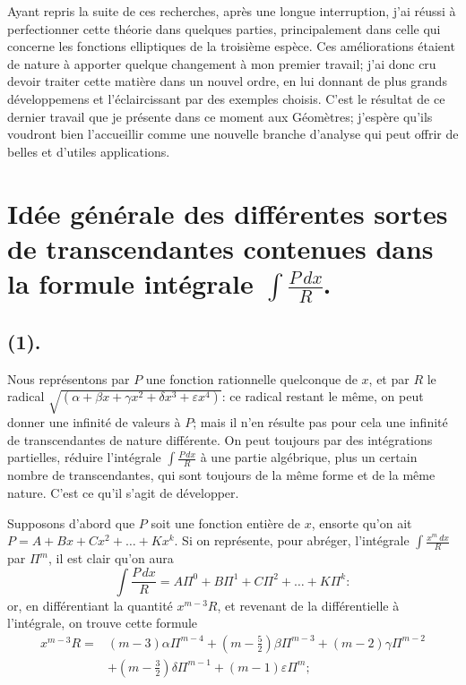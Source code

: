 \documentclass{article}
\begin{document}
Ayant repris la suite de ces recherches, après une longue interruption, j'ai réussi à perfectionner cette théorie dans quelques parties, principalement dans celle qui concerne les fonctions elliptiques de la troisième espèce. Ces améliorations étaient de nature à apporter quelque changement à mon premier travail; j'ai donc cru devoir traiter cette matière dans un nouvel ordre, en lui donnant de plus grands développemens et l'éclaircissant par des exemples choisis. C'est le résultat de ce dernier travail que je présente dans ce moment aux Géomètres; j'espère qu'ils voudront bien l'accueillir comme une nouvelle branche d'analyse qui peut offrir de belles et d'utiles applications.

\section*{Idée générale des différentes sortes de transcendantes contenues dans la formule intégrale $\displaystyle\int\frac{P\,dx}{R}$.}

\subsection*{(1).}

Nous représentons par $P$ une fonction rationnelle quelconque de $x$, et par $R$ le radical $\sqrt{(\alpha+\beta x+\gamma x^{2}+\delta x^{3}+\varepsilon x^{4})}$: ce radical restant le même, on peut donner une infinité de valeurs à $P$; mais il n'en résulte pas pour cela une infinité de transcendantes de nature différente. On peut toujours par des intégrations partielles, réduire l'intégrale $\displaystyle\int\frac{P\,dx}{R}$ à une partie algébrique, plus un certain nombre de transcendantes, qui sont toujours de la même forme et de la même nature. C'est ce qu'il s'agit de développer.

Supposons d'abord que $P$ soit une fonction entière de $x$, ensorte qu'on ait $P=A+Bx+Cx^{2}+\ldots+Kx^{k}$. Si on représente, pour abréger, l'intégrale $\displaystyle\int\frac{x^{m}\,dx}{R}$ par $\Pi^{m}$, il est clair qu'on aura
\[ \int\frac{P\,dx}{R}=A\Pi^{0}+B\Pi^{1}+C\Pi^{2}+\ldots+K\Pi^{k}: \]
or, en différentiant la quantité $x^{m-3}R$, et revenant de la différentielle à l'intégrale, on trouve cette formule
\[ \begin{aligned} x^{m-3}R={}&(m-3)\alpha\Pi^{m-4}+(m-\tfrac{5}{2})\beta\Pi^{m-3}+(m-2)\gamma\Pi^{m-2}\\ &+(m-\tfrac{3}{2})\delta\Pi^{m-1}+(m-1)\varepsilon\Pi^{m}; \end{aligned} \]
\end{document}
